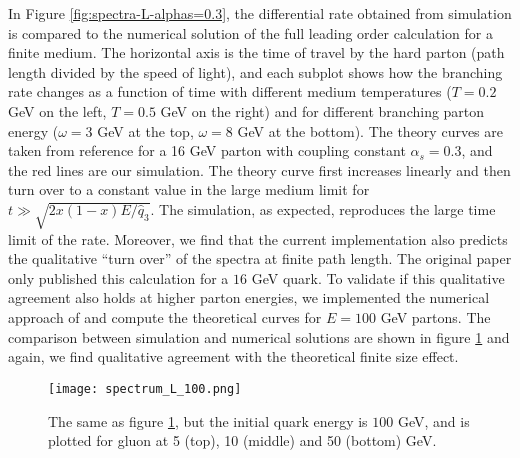In Figure \ref{fig:spectra-L-alphas=0.3}, the differential rate obtained from simulation is compared to the numerical solution of the full leading order calculation for a finite medium.
The horizontal axis is the time of travel by the hard parton (path length divided by the speed of light), and each subplot shows how the branching rate changes as a function of time with different medium temperatures ($T=0.2$ GeV on the left, $T=0.5$ GeV on the right) and for different branching parton energy ($\omega=3$ GeV at the top, $\omega=8$ GeV at the bottom).
The theory curves are taken from reference \cite{CaronHuot:2010bp} for a 16 GeV parton with coupling constant $\alpha_s = 0.3$, and the red lines are our simulation.
The theory curve first increases linearly and then turn over to a constant value in the large medium limit for $t \gg \sqrt{2x(1-x)E/\hat{q}_3}$.
The simulation, as expected, reproduces the large time limit of the rate.
Moreover, we find that the current implementation also predicts the qualitative ``turn over'' of the spectra at finite path length.
The original paper only published this calculation for a $16$ GeV quark. 
To validate if this qualitative agreement also holds at higher parton energies, we implemented the numerical approach of \cite{CaronHuot:2010bp} and compute the theoretical curves for $E=100$ GeV partons.
The comparison between simulation and numerical solutions are shown in figure \ref{fig:spectra-L-alphas=0.3-E100} and again, we find qualitative agreement with the theoretical finite size effect.

\begin{figure}
\singlespacing
\centering
\texttt{[image: spectrum\_L\_100.png]}
\caption[The same as figure \ref{fig:spectra-L-alphas=0.3-E100}, but the initial quark energy is $100$ GeV,]{The same as figure \ref{fig:spectra-L-alphas=0.3-E100}, but the initial quark energy is $100$ GeV, and is plotted for gluon at 5 (top), 10 (middle) and 50 (bottom) GeV.}
\label{fig:spectra-L-alphas=0.3-E100}
\end{figure}

